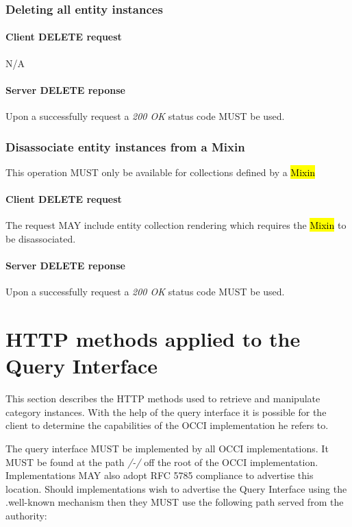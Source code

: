 \documentclass[10pt,a4paper]{article}
\begin{document}
\subsubsection{Deleting all entity instances}

\paragraph{Client DELETE request}
N/A

\paragraph{Server DELETE reponse}
Upon a successfully request a \emph{200 OK} status code MUST be used.

\subsubsection{Disassociate entity instances from a Mixin}
This operation MUST only be available for collections defined by a \hl{Mixin}

\paragraph{Client DELETE request}
The request MAY include entity collection rendering which requires the \hl{Mixin} to be disassociated.

\paragraph{Server DELETE reponse}
Upon a successfully request a \emph{200 OK} status code MUST be used.

\section{HTTP methods applied to the Query Interface}
This section describes the HTTP methods used to retrieve and manipulate category instances.  With the help of the query interface it is possible for the client to determine the capabilities of the OCCI implementation he refers to. 

The query interface MUST be implemented by all OCCI implementations. It MUST be found at the path \emph{/-/} off the root of the OCCI implementation. Implementations MAY also adopt RFC 5785 \cite{rfc5785} compliance to advertise this location. Should implementations wish to advertise the Query Interface using the .well-known mechanism then they MUST use the following path served from the authority:
\end{document}
